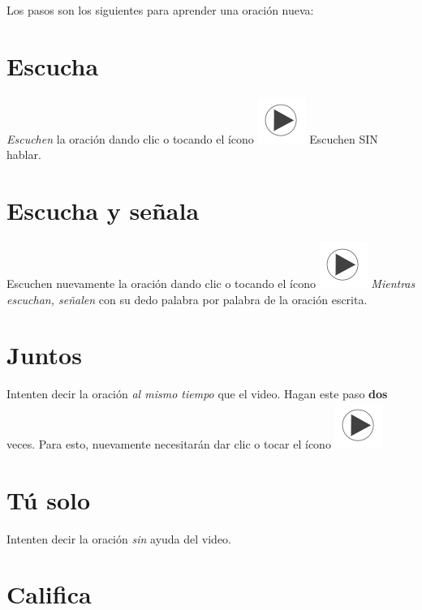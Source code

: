 \documentclass[
]{book}
\begin{document}
Los pasos son los siguientes para aprender una oración nueva:

\hypertarget{cross_2}{%
\section{Escucha}\label{cross_2}}

\emph{Escuchen} la oración dando clic o tocando el ícono \includegraphics{images/play_icon.png} Escuchen SIN hablar.

\hypertarget{escucha-y-seuxf1ala}{%
\section{Escucha y señala}\label{escucha-y-seuxf1ala}}

Escuchen nuevamente la oración dando clic o tocando el ícono \includegraphics{images/play_icon.png} \emph{Mientras escuchan, señalen} con su dedo palabra por palabra de la oración escrita.

\hypertarget{juntos}{%
\section{Juntos}\label{juntos}}

Intenten decir la oración \emph{al mismo tiempo} que el video. Hagan este paso \textbf{dos} veces. Para esto, nuevamente necesitarán dar clic o tocar el ícono \includegraphics{images/play_icon.png}

\hypertarget{tuxfa-solo}{%
\section{Tú solo}\label{tuxfa-solo}}

Intenten decir la oración \emph{sin} ayuda del video.

\hypertarget{califica}{%
\section{Califica}\label{califica}}
\end{document}
